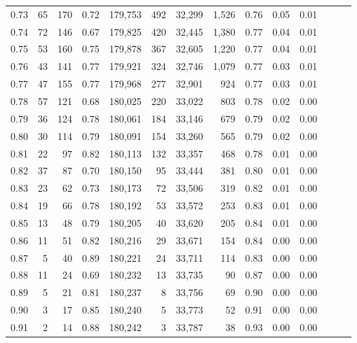 \begin{tabular}{rrrrrrrrrrrrrr}
0.73 &     65 &  170 &  0.72 &  179,753 &      492 &  32,299 &   1,526 &  0.76 &  0.05 &      0.01 \\
0.74 &     72 &  146 &  0.67 &  179,825 &      420 &  32,445 &   1,380 &  0.77 &  0.04 &      0.01 \\
0.75 &     53 &  160 &  0.75 &  179,878 &      367 &  32,605 &   1,220 &  0.77 &  0.04 &      0.01 \\
0.76 &     43 &  141 &  0.77 &  179,921 &      324 &  32,746 &   1,079 &  0.77 &  0.03 &      0.01 \\
0.77 &     47 &  155 &  0.77 &  179,968 &      277 &  32,901 &     924 &  0.77 &  0.03 &      0.01 \\
0.78 &     57 &  121 &  0.68 &  180,025 &      220 &  33,022 &     803 &  0.78 &  0.02 &      0.00 \\
0.79 &     36 &  124 &  0.78 &  180,061 &      184 &  33,146 &     679 &  0.79 &  0.02 &      0.00 \\
0.80 &     30 &  114 &  0.79 &  180,091 &      154 &  33,260 &     565 &  0.79 &  0.02 &      0.00 \\
0.81 &     22 &   97 &  0.82 &  180,113 &      132 &  33,357 &     468 &  0.78 &  0.01 &      0.00 \\
0.82 &     37 &   87 &  0.70 &  180,150 &       95 &  33,444 &     381 &  0.80 &  0.01 &      0.00 \\
0.83 &     23 &   62 &  0.73 &  180,173 &       72 &  33,506 &     319 &  0.82 &  0.01 &      0.00 \\
0.84 &     19 &   66 &  0.78 &  180,192 &       53 &  33,572 &     253 &  0.83 &  0.01 &      0.00 \\
0.85 &     13 &   48 &  0.79 &  180,205 &       40 &  33,620 &     205 &  0.84 &  0.01 &      0.00 \\
0.86 &     11 &   51 &  0.82 &  180,216 &       29 &  33,671 &     154 &  0.84 &  0.00 &      0.00 \\
0.87 &      5 &   40 &  0.89 &  180,221 &       24 &  33,711 &     114 &  0.83 &  0.00 &      0.00 \\
0.88 &     11 &   24 &  0.69 &  180,232 &       13 &  33,735 &      90 &  0.87 &  0.00 &      0.00 \\
0.89 &      5 &   21 &  0.81 &  180,237 &        8 &  33,756 &      69 &  0.90 &  0.00 &      0.00 \\
0.90 &      3 &   17 &  0.85 &  180,240 &        5 &  33,773 &      52 &  0.91 &  0.00 &      0.00 \\
0.91 &      2 &   14 &  0.88 &  180,242 &        3 &  33,787 &      38 &  0.93 &  0.00 &      0.00 \\

\end{tabular}
